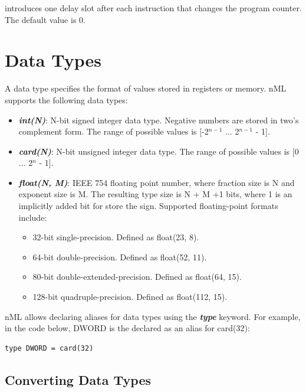 \documentclass[oneside,final,14pt]{extreport}
\begin{document}
introduces one delay slot after each instruction that changes the program counter.
The default value is 0.


\section{Data Types}

A data type specifies the format of values stored in registers or memory.
nML supports the following data types:

\begin{itemize}

\item \textbf{\textit{int(N)}}:
N-bit signed integer data type. Negative numbers are stored in two's complement
form. The range of possible values is [-2$^{n-1}$ ... 2$^{n-1}$ - 1].

\item \textbf{\textit{card(N)}}:
N-bit unsigned integer data type. The range of possible values is [0 ... 2$^n$ - 1].

\item \textbf{\textit{float(N, M)}}: IEEE 754 floating point number, where fraction
size is N and exponent size is M. The resulting type size is N + M +1 bits, where 1
is an implicitly added bit for store the sign. Supported floating-point formats include:

\begin{itemize}
\item 32-bit single-precision. Defined as float(23, 8).
\item 64-bit double-precision. Defined as float(52, 11).
\item 80-bit double-extended-precision. Defined as float(64, 15).
\item 128-bit quadruple-precision. Defined as float(112, 15).
\end{itemize}

\end{itemize}

nML allows declaring aliases for data types using the \textbf{\textit{type}} keyword.
For example, in the code below, DWORD is the declared as an alias for card(32):

\begin{lstlisting}
type DWORD = card(32)
\end{lstlisting}

\subsection{Converting Data Types}
\end{document}

